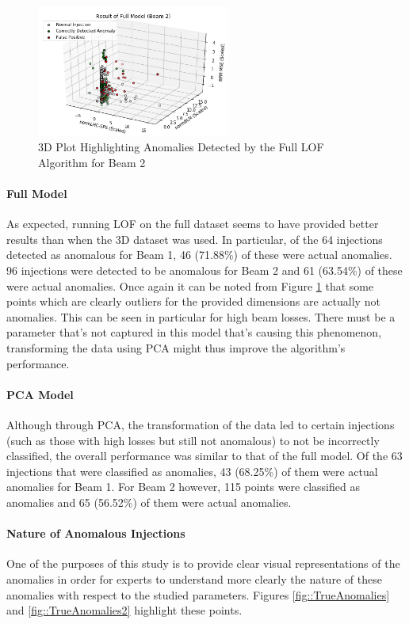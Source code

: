 \documentclass[conference, a4paper]{IEEEtran}
\begin{document}
	\begin{figure}[!b]
		\centering
		\includegraphics[width=2.5in]{Beam2_Full_Results}
		\caption[Full Dataset Results Beam 2]{3D Plot Highlighting Anomalies Detected by the Full LOF Algorithm for Beam 2}
		\label{fig::Full_results2}
	\end{figure} 
	

	\paragraph{Full Model}As expected, running LOF on the full dataset seems to have provided better results than when the 3D dataset was used. In particular, of the 64 injections detected as anomalous for Beam 1, 46 (71.88\%) of these were actual anomalies.  96 injections were detected to be anomalous for Beam 2 and 61 (63.54\%) of these were actual anomalies. Once again it can be noted from Figure \ref{fig::Full_results2} that some points which are clearly outliers for the provided dimensions are actually not anomalies. This can be seen in particular for high beam losses. There must be a parameter that's not captured in this model that's causing this phenomenon, transforming the data using PCA might thus improve the algorithm's performance.

	\paragraph{PCA Model}Although through PCA, the transformation of the data led to certain injections (such as those with high losses but still not anomalous) to not be incorrectly classified, the overall performance was similar to that of the full model. Of the 63 injections that were classified as anomalies, 43 (68.25\%) of them were actual anomalies for Beam 1. For Beam 2 however, 115 points were classified as anomalies and 65 (56.52\%) of them were actual anomalies.

	\paragraph{Nature of Anomalous Injections}One of the purposes of this study is to provide clear visual representations of the anomalies in order for experts to understand more clearly the nature of these anomalies with respect to the studied parameters. Figures \ref{fig::TrueAnomalies} and \ref{fig::TrueAnomalies2} highlight these points.
	
\end{document}
